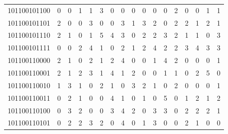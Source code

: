 \documentclass[10pt,a4paper]{article}
\begin{document}
\begin{longtable}{ |c|c|c|c|c|c|c|c|c|c|c|c|c|c|c|c|c| }
    101100101100              & 0                            & 0                                & 1                            & 1                              & 3   & 0   & 0   & 0   & 0   & 0   & 0   & 2   & 0   & 0   & 1   & 1   \\
    101100101101              & 2                            & 0                                & 0                            & 3                              & 0   & 0   & 3   & 1   & 3   & 2   & 0   & 2   & 2   & 1   & 2   & 1   \\
    101100101110              & 2                            & 1                                & 0                            & 1                              & 5   & 4   & 3   & 0   & 2   & 2   & 3   & 2   & 1   & 1   & 0   & 3   \\
    101100101111              & 0                            & 0                                & 2                            & 4                              & 1   & 0   & 2   & 1   & 2   & 4   & 2   & 2   & 3   & 4   & 3   & 3   \\
    101100110000              & 2                            & 1                                & 0                            & 2                              & 1   & 2   & 4   & 0   & 0   & 1   & 4   & 2   & 0   & 0   & 0   & 1   \\
    101100110001              & 2                            & 1                                & 2                            & 3                              & 1   & 4   & 1   & 2   & 0   & 0   & 1   & 1   & 0   & 2   & 5   & 0   \\
    101100110010              & 1                            & 3                                & 1                            & 0                              & 2   & 1   & 0   & 3   & 2   & 1   & 0   & 2   & 0   & 0   & 0   & 1   \\
    101100110011              & 0                            & 2                                & 1                            & 0                              & 0   & 4   & 1   & 0   & 1   & 0   & 5   & 0   & 1   & 2   & 1   & 2   \\
    101100110100              & 0                            & 3                                & 2                            & 0                              & 0   & 3   & 4   & 2   & 0   & 3   & 3   & 0   & 2   & 2   & 2   & 1   \\
    101100110101              & 0                            & 2                                & 2                            & 3                              & 2   & 0   & 4   & 0   & 1   & 3   & 0   & 0   & 2   & 1   & 0   & 0   \\

\end{longtable}
\end{document}
